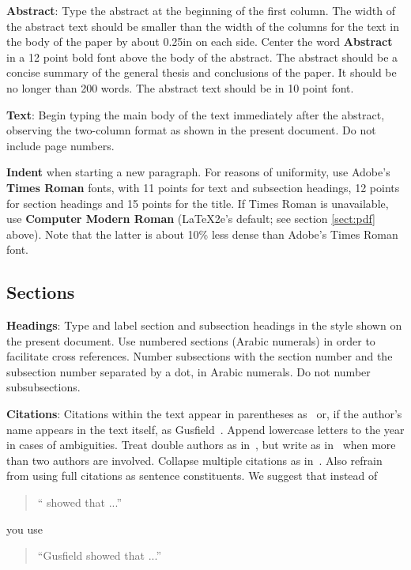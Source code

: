 \documentclass[11pt]{article}
\begin{document}
{\bf Abstract}: Type the abstract at the beginning of the first
column.  The width of the abstract text should be smaller than the
width of the columns for the text in the body of the paper by about
0.25in on each side.  Center the word {\bf Abstract} in a 12 point
bold font above the body of the abstract. The abstract should be a
concise summary of the general thesis and conclusions of the paper.
It should be no longer than 200 words. The abstract text should be in 10 point font.

{\bf Text}: Begin typing the main body of the text immediately after
the abstract, observing the two-column format as shown in
the present document. Do not include page numbers.

{\bf Indent} when starting a new paragraph. For reasons of uniformity,
use Adobe's {\bf Times Roman} fonts, with 11 points for text and
subsection headings, 12 points for section headings and 15 points for
the title.  If Times Roman is unavailable, use {\bf Computer Modern
  Roman} (\LaTeX2e's default; see section \ref{sect:pdf} above).
Note that the latter is about 10\% less dense than Adobe's Times Roman
font.

\subsection{Sections}

{\bf Headings}: Type and label section and subsection headings in the
style shown on the present document.  Use numbered sections (Arabic
numerals) in order to facilitate cross references. Number subsections
with the section number and the subsection number separated by a dot,
in Arabic numerals. Do not number subsubsections.

{\bf Citations}: Citations within the text appear
in parentheses as~\cite{Gusfield:97} or, if the author's name appears in
the text itself, as Gusfield~. Append lowercase letters to the year in cases of ambiguities. Treat double authors as in~\cite{Aho:72}, but write as in~\cite{Chandra:81} when more than two authors are involved. Collapse multiple citations as in~\cite{Gusfield:97,Aho:72}. Also refrain from using full citations as sentence constituents. We suggest that instead of
\begin{quote}
  ``\cite{Gusfield:97} showed that ...''
\end{quote}
you use
\begin{quote}
``Gusfield    showed that ...''
\end{quote}
\end{document}
